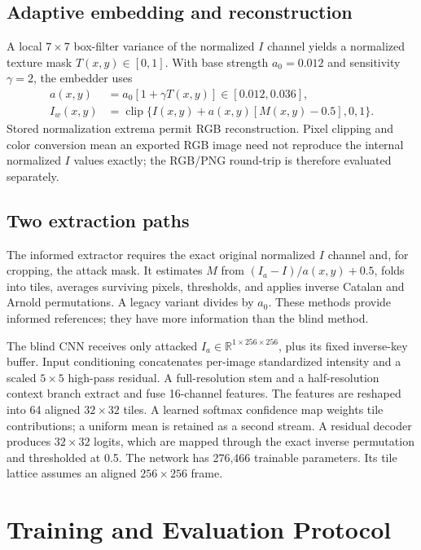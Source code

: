 \documentclass[conference]{IEEEtran}
\begin{document}
\subsection{Adaptive embedding and reconstruction}
A local $7\times7$ box-filter variance of the normalized $I$ channel yields a normalized texture mask $T(x,y)\in[0,1]$. With base strength $a_0=0.012$ and sensitivity $\gamma=2$, the embedder uses
\begin{align}
a(x,y)&=a_0[1+\gamma T(x,y)]\in[0.012,0.036],\\
I_w(x,y)&=\operatorname{clip}\{I(x,y)+a(x,y)[M(x,y)-0.5],0,1\}.
\end{align}
Stored normalization extrema permit RGB reconstruction. Pixel clipping and color conversion mean an exported RGB image need not reproduce the internal normalized $I$ values exactly; the RGB/PNG round-trip is therefore evaluated separately.

\subsection{Two extraction paths}
The informed extractor requires the exact original normalized $I$ channel and, for cropping, the attack mask. It estimates $M$ from $(I_a-I)/a(x,y)+0.5$, folds into tiles, averages surviving pixels, thresholds, and applies inverse Catalan and Arnold permutations. A legacy variant divides by $a_0$. These methods provide informed references; they have more information than the blind method.

The blind CNN receives only attacked $I_a\in\mathbb{R}^{1\times256\times256}$, plus its fixed inverse-key buffer. Input conditioning concatenates per-image standardized intensity and a scaled $5\times5$ high-pass residual. A full-resolution stem and a half-resolution context branch extract and fuse 16-channel features. The features are reshaped into 64 aligned $32\times32$ tiles. A learned softmax confidence map weights tile contributions; a uniform mean is retained as a second stream. A residual decoder produces $32\times32$ logits, which are mapped through the exact inverse permutation and thresholded at 0.5. The network has 276,466 trainable parameters. Its tile lattice assumes an aligned $256\times256$ frame.

\section{Training and Evaluation Protocol}
\end{document}
